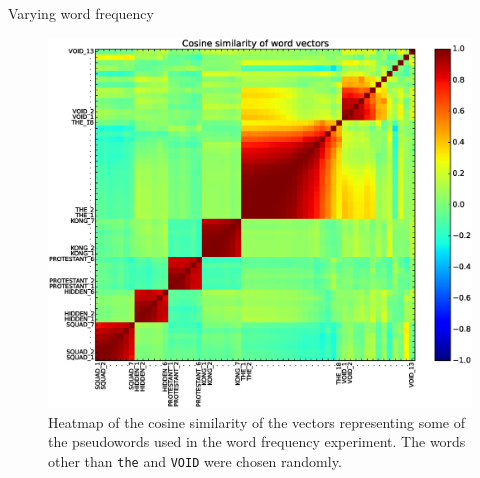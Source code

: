 \documentclass{article} %
\newcommand{\word}[1]{\texttt{#1}}
\begin{document}
\begin{section}{Varying word frequency}
\begin{figure}
	\includegraphics[scale=0.5]{word-frequency-experiment-heatmap}
	\caption{ Heatmap of the cosine similarity of the vectors
          representing some of the pseudowords used in the word frequency
          experiment.  The words other than \word{the} and \word{VOID}
          were chosen randomly.  }
	\label{word-frequency-experiment-heatmap}
\end{figure}

\begin{table}
	
	\caption{ Words in the original vocabulary most similar to the
          pseudowords \word{THE\_i}, and their cosine similarity with the
          most frequent such pseudoword, \word{THE\_1}.  It is apparent from
          the nearest neighbour list that the vectors of the
          low-frequency pseudowords have not been adequately trained.  }
	\label{word-frequency-experiment-cosine-similarity}
\end{table}


\end{section}
\end{document}
